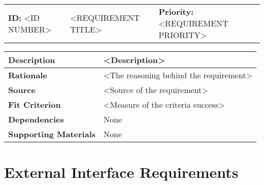 \begin{table}[H]
    \begin{tabularx}{\textwidth}{| l | X | l |}
        \hline
        \textbf{ID:} <ID NUMBER> & <REQUIREMENT TITLE> & \textbf{Priority:} <REQUIREMENT PRIORITY> \\
    \end{tabularx}
    \begin{tabularx}{\textwidth}{| l | X |}
        \hline
        \textbf{Description} & <Description> \\ \hline
        \textbf{Rationale} & <The reasoning behind the requirement> \\ \hline
        \textbf{Source} &  <Source of the requirement>\\ \hline
        \textbf{Fit Criterion} &  <Measure of the criteria success>  \\ \hline
        \textbf{Dependencies} & None \\ \hline
        \textbf{Supporting Materials} & None \\ \hline
    \end{tabularx}
\end{table}



\clearpage



\section{External Interface Requirements}

